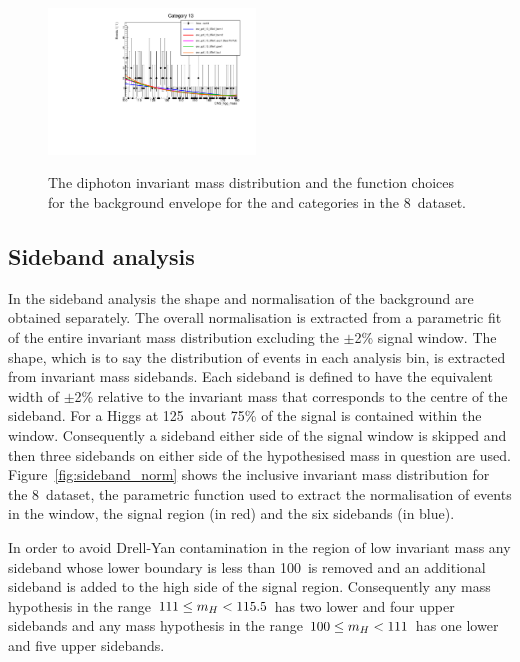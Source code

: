 \begin{figure}
  \includegraphics[width=0.49\textwidth]{ch5_anal_and_results/plots/mva_8TeV/multipdf_cat13.pdf}\\
  \caption{The diphoton invariant mass distribution and the function choices for the background envelope for the \VH and \ttH categories in the 8~\TeV dataset. }
  \label{fig:multipdf6}
\end{figure}

\subsection{Sideband analysis}

In the sideband analysis the shape and normalisation of the background are obtained separately. The overall normalisation is extracted from a parametric fit of the entire invariant mass distribution excluding the $\pm$2\% signal window. The shape, which is to say the distribution of events in each analysis bin, is extracted from invariant mass sidebands. Each sideband is defined to have the equivalent width of $\pm$2\% relative to the invariant mass that corresponds to the centre of the sideband. For a \SM Higgs at 125~\GeV about 75\% of the signal is contained within the window. Consequently a sideband either side of the signal window is skipped and then three sidebands on either side of the hypothesised mass in question are used. Figure~\ref{fig:sideband_norm} shows the inclusive invariant mass distribution for the 8~\TeV dataset, the parametric function used to extract the normalisation of events in the window, the signal region (in red) and the six sidebands (in blue).

In order to avoid Drell-Yan contamination in the region of low invariant mass any sideband whose lower boundary is less than 100~\GeV is removed and an additional sideband is added to the high side of the signal region. Consequently any mass hypothesis in the range $111\leq m_{H}< 115.5$ has two lower and four upper sidebands and any mass hypothesis in the range $100\leq m_{H}<111$ has one lower and five upper sidebands.

